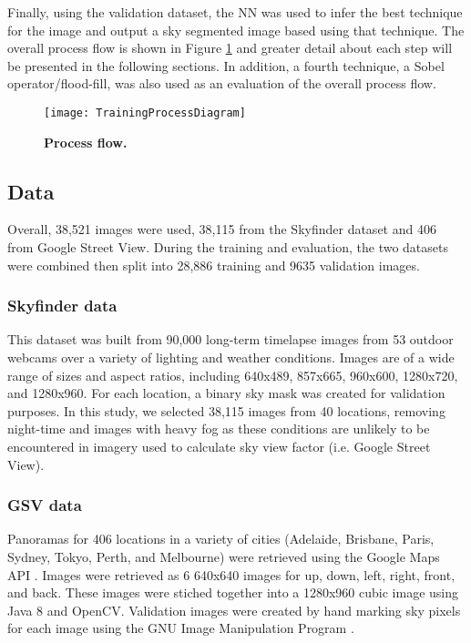 \documentclass[final,3p,times,authoryear]{elsarticle}
\begin{document}
Finally, using the validation dataset, the NN was used to infer the best technique for the image and output a sky segmented image based using that technique. The overall process flow is shown in Figure \ref{fig:process} and greater detail about each step will be presented in the following sections. In addition, a fourth technique, a Sobel operator/flood-fill, was also used as an evaluation of the overall process flow.

\begin{figure}
\centering    
\texttt{[image: TrainingProcessDiagram]}
\caption{\bf  Process flow.}    
 \label{fig:process}  
\end{figure} 


\subsection{Data}\label{sec:data}
Overall, 38,521 images were used, 38,115 from the Skyfinder dataset and 406 from Google Street View. During the training and evaluation, the two datasets were combined then split into 28,886 training and 9635 validation images.


\subsubsection{Skyfinder data}\label{sec:finderdata}
This dataset was built from 90,000 long-term timelapse images from 53 outdoor webcams over a variety of lighting and weather conditions. Images are of a wide range of sizes and aspect ratios, including 640x489, 857x665, 960x600, 1280x720, and 1280x960. For each location, a binary sky mask was created for validation purposes. In this study, we selected 38,115 images from 40 locations, removing night-time and images with heavy fog as these conditions are unlikely to be encountered in imagery used to calculate sky view factor (i.e. Google Street View).

\subsubsection{GSV data}\label{sec:gsvdata}
Panoramas for 406 locations in a variety of cities (Adelaide, Brisbane, Paris, Sydney, Tokyo, Perth, and Melbourne) were retrieved using the Google Maps API \citep{GoogleMaps2017b}. Images were retrieved as 6 640x640 images for up, down, left, right, front, and back. These images were stiched together into a 1280x960 cubic image using Java 8 \citep{Oracle2018} and OpenCV\citep {Bradski2000}. Validation images were created by hand marking sky pixels for each image using the GNU Image Manipulation Program \citep{GIMP2019}.
\end{document}
